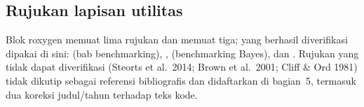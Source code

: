 
\subsection{Rujukan lapisan utilitas}\label{sec:util-ref}

Blok roxygen  memuat lima rujukan dan
 memuat tiga; yang berhasil diverifikasi dipakai di
sini: \citet{rao2015small} (bab benchmarking), \citet{you2002pseudo},
\citet{datta2010bayesian} (benchmarking Bayes), dan \citet{berg2014small}.
Rujukan yang tidak dapat diverifikasi (Steorts et al.\
2014; Brown et al.\ 2001; Cliff \& Ord 1981) tidak dikutip sebagai
referensi bibliografis dan didaftarkan di 
bagian~5, termasuk dua koreksi judul/tahun terhadap teks kode.
